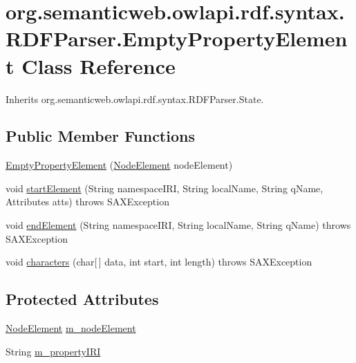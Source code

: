 \hypertarget{classorg_1_1semanticweb_1_1owlapi_1_1rdf_1_1syntax_1_1_r_d_f_parser_1_1_empty_property_element}{\section{org.\-semanticweb.\-owlapi.\-rdf.\-syntax.\-R\-D\-F\-Parser.\-Empty\-Property\-Element Class Reference}
\label{classorg_1_1semanticweb_1_1owlapi_1_1rdf_1_1syntax_1_1_r_d_f_parser_1_1_empty_property_element}
}


Inherits org.\-semanticweb.\-owlapi.\-rdf.\-syntax.\-R\-D\-F\-Parser.\-State.

\subsection*{Public Member Functions}
\begin{DoxyCompactItemize}
\item 
\hyperlink{classorg_1_1semanticweb_1_1owlapi_1_1rdf_1_1syntax_1_1_r_d_f_parser_1_1_empty_property_element_a01369979c2c4ac2f332f6de8f3a3af4d}{Empty\-Property\-Element} (\hyperlink{classorg_1_1semanticweb_1_1owlapi_1_1rdf_1_1syntax_1_1_r_d_f_parser_1_1_node_element}{Node\-Element} node\-Element)
\item 
void \hyperlink{classorg_1_1semanticweb_1_1owlapi_1_1rdf_1_1syntax_1_1_r_d_f_parser_1_1_empty_property_element_adfbfbbf77af6b21575dfdba1ec40ffd8}{start\-Element} (String namespace\-I\-R\-I, String local\-Name, String q\-Name, Attributes atts)  throws S\-A\-X\-Exception 
\item 
void \hyperlink{classorg_1_1semanticweb_1_1owlapi_1_1rdf_1_1syntax_1_1_r_d_f_parser_1_1_empty_property_element_a264e971747d790dc02fbaf8c3d6ba297}{end\-Element} (String namespace\-I\-R\-I, String local\-Name, String q\-Name)  throws S\-A\-X\-Exception 
\item 
void \hyperlink{classorg_1_1semanticweb_1_1owlapi_1_1rdf_1_1syntax_1_1_r_d_f_parser_1_1_empty_property_element_aacc13239cd6b7232f7d424901178e3f9}{characters} (char\mbox{[}$\,$\mbox{]} data, int start, int length)  throws S\-A\-X\-Exception 
\end{DoxyCompactItemize}
\subsection*{Protected Attributes}
\begin{DoxyCompactItemize}
\item 
\hyperlink{classorg_1_1semanticweb_1_1owlapi_1_1rdf_1_1syntax_1_1_r_d_f_parser_1_1_node_element}{Node\-Element} \hyperlink{classorg_1_1semanticweb_1_1owlapi_1_1rdf_1_1syntax_1_1_r_d_f_parser_1_1_empty_property_element_a6b163a85761c7cbb0663a043e926f7b6}{m\-\_\-node\-Element}
\item 
String \hyperlink{classorg_1_1semanticweb_1_1owlapi_1_1rdf_1_1syntax_1_1_r_d_f_parser_1_1_empty_property_element_a5e8ea8dec7b3aa069c4e780b548158f0}{m\-\_\-property\-I\-R\-I}
\end{DoxyCompactItemize}


